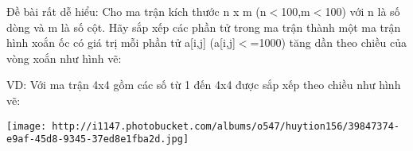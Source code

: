 Đề bài rất dễ hiểu: Cho ma trận kích thước n x m (n$<$100,m$<$100) với n là số dòng và m là số cột. Hãy sắp xếp các phần tử trong ma trận thành một ma trận hình xoắn ốc có giá trị mỗi phần tử a[i,j] (a[i,j]$<$=1000) tăng dần theo chiều của vòng xoắn như hình vẽ:

VD: Với ma trận 4x4 gồm các số từ 1 đến 4x4 được sắp xếp theo chiều như hình vẽ:


\texttt{[image: http://i1147.photobucket.com/albums/o547/huytion156/39847374-e9af-45d8-9345-37ed8e1fba2d.jpg]}
